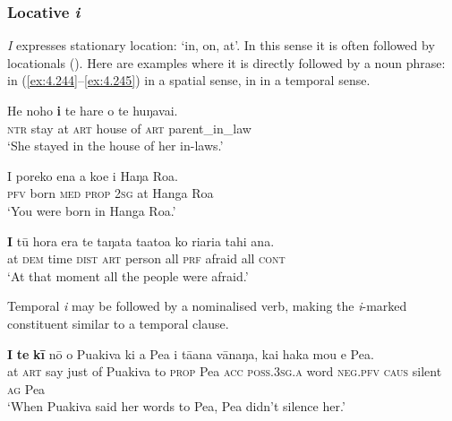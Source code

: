 \subsubsection[Locative {\ꞌ}i]{Locative \textit{{\ꞌ}i}}\label{sec:4.7.2.1}

\textit{{\ꞌ}I} expresses stationary location: ‘in, on, at’. In this sense it is often followed by locationals (). Here are examples where it is directly followed by a noun phrase: in (\ref{ex:4.244}–\ref{ex:4.245}) in a spatial sense, in  in a temporal sense.

\ea\label{ex:4.244}
\gll He noho \textbf{{\ꞌ}i} te hare o te huŋavai. \\
\textsc{ntr} stay at \textsc{art} house of \textsc{art} parent\_in\_law \\

\glt 
‘She stayed in the house of her in-laws.’ \textstyleExampleref{[Mtx-5-03.002]}
\z

\ea\label{ex:4.245}
\gll I poreko ena a koe {\ꞌ}i Haŋa Roa. \\
\textsc{pfv} born \textsc{med} \textsc{prop} \textsc{2sg} at Hanga Roa \\

\glt 
‘You were born in Hanga Roa.’ \textstyleExampleref{[R380.156]} 
\z

\ea\label{ex:4.246}
\gll \textbf{{\ꞌ}I} tū hora era te taŋata ta{\ꞌ}ato{\ꞌ}a ko ri{\ꞌ}ari{\ꞌ}a tahi {\ꞌ}ana. \\
at \textsc{dem} time \textsc{dist} \textsc{art} person all \textsc{prf} afraid all \textsc{cont} \\

\glt
‘At that moment all the people were afraid.’ \textstyleExampleref{[R210.152]} 
\z

Temporal \textit{{\ꞌ}i} may be followed by a nominalised verb, making the \textit{{\ꞌ}i}{}-marked constituent similar to a temporal clause.

\ea\label{ex:4.247}
\gll \textbf{{\ꞌ}I} \textbf{te} \textbf{kī} nō o Puakiva ki a Pea i tā{\ꞌ}ana vānaŋa,  kai haka mou e Pea.\\
at \textsc{art} say just of Puakiva to \textsc{prop} Pea \textsc{acc} \textsc{poss.3sg.a} word  \textsc{neg.pfv} \textsc{caus} silent \textsc{ag} Pea\\

\glt
‘When Puakiva said her words to Pea, Pea didn’t silence her.’ \textstyleExampleref{[R229.489]} 
\z

